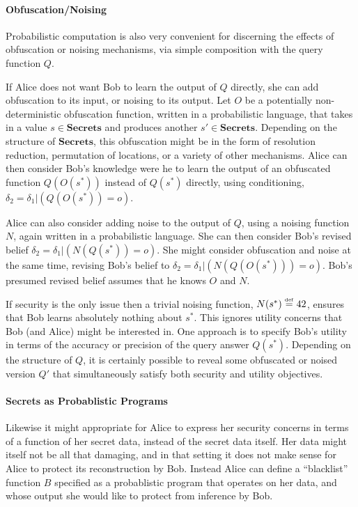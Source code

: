 \documentclass{article} %
\newcommand{\secrets}[0]{\textbf{Secrets}}
\newcommand{\asecret}[0]{s}
\newcommand{\rsecret}[0]{\asecret^*}
\newcommand{\paren}[1]{\left( #1 \right)}
\newcommand{\cond}[0]{|}
\newcommand{\stacklabel}[1]{\stackrel{\smash{\scriptscriptstyle \mathrm{#1}}}}
\newcommand{\defeq}{\stacklabel{def}=}
\theoremstyle{plain} %
\theoremstyle{definition} %
\begin{document}
\paragraph*{Obfuscation/Noising} Probabilistic computation is also very
convenient for discerning the effects of obfuscation or noising
mechanisms, via simple composition with the query function $ Q $.

If Alice does not want Bob to learn the output of $ Q $ directly, she
can add obfuscation to its input, or noising to its output. Let $ O $
be a potentially non-deterministic obfuscation function, written in a
probabilistic language, that takes in a value $ \asecret \in \secrets
$ and produces another $ \asecret' \in \secrets $. Depending on the
structure of $ \secrets $, this obfuscation might be in the form of
resolution reduction, permutation of locations, or a variety of other
mechanisms. Alice can then consider Bob's knowledge were he to learn
the output of an obfuscated function $ Q(O(\rsecret)) $ instead of $
Q(\rsecret) $ directly, using conditioning, $ \delta_2 = \delta_1
\cond \paren{Q(O(\rsecret)) = o} $.

Alice can also consider adding noise to the output of $ Q $, using a
noising function $ N $, again written in a probabilistic language. She
can then consider Bob's revised belief $ \delta_2 = \delta_1 \cond
\paren{N(Q(\rsecret)) = o} $. She might consider obfuscation and noise
at the same time, revising Bob's belief to $ \delta_2 = \delta_1 \cond
\paren{N(Q(O(\rsecret))) = o} $. Bob's presumed revised belief assumes
that he knows $ O $ and $ N $.

If security is the only issue then a trivial noising function, $
N(\rsecret) \defeq 42 $, ensures that Bob learns absolutely nothing
about $ \rsecret $.  This ignores utility concerns that Bob (and
Alice) might be interested in. One approach is to specify Bob's
utility in terms of the accuracy or precision of the query answer $
Q(\rsecret) $.  Depending on the structure of $ Q $, it is certainly
possible to reveal some obfuscated or noised version $Q'$ that
simultaneously satisfy both security and utility objectives.

\paragraph*{Secrets as Probablistic Programs} Likewise it might
appropriate for Alice to express her security concerns in terms of a
function of her secret data, instead of the secret data itself.
Her data might itself not be all that damaging, and in that
setting it does not make sense for Alice to protect its reconstruction
by Bob. Instead Alice can define a ``blacklist'' function $ B $
specified as a probablistic program that operates on her data, and
whose output she would like to protect from inference by Bob.
\end{document}
